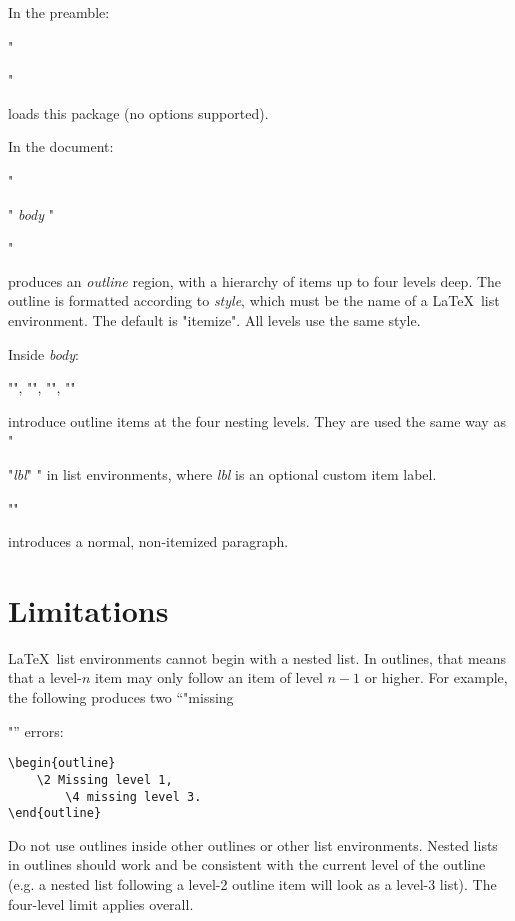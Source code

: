 \documentclass[11pt]{article}
\begin{document}
\begin{outline}

\0 In the preamble:

\1 "\usepackage{outlines}" 

loads this package (no options supported).

\0 In the document:

\1 "\begin{outline}" \emph{body} "\end{outline}" 

produces an \emph{outline} region, with a hierarchy of items up to four levels deep.  The outline is formatted according to \emph{style}, which must be the name of a \LaTeX\ list environment.  The default is "itemize".  All levels use the same style.

\0 Inside \emph{body}:

\1 "", "", "",
""

introduce outline items at the four nesting levels.  They are
used the same way as "\item["\emph{lbl}"]" in list environments, where
\emph{lbl} is an optional custom item label.  

\1 "\0"

introduces a normal, non-itemized paragraph.

\end{outline}

\section{Limitations}

\LaTeX\ list environments cannot begin with a nested list.
In outlines, that means that a level-$n$ item may only follow an item
of level $n-1$ or higher.  For example, the following produces two
``"missing \item"'' errors:

\begin{verbatim}
\begin{outline}
    \2 Missing level 1,
        \4 missing level 3.
\end{outline}
\end{verbatim}

Do not use outlines inside other outlines or other list environments.
Nested lists in outlines should work and be consistent with the current
level of the outline (e.g. a nested list following a level-2 outline
item will look as a level-3 list). The four-level limit applies overall.
\end{document}
